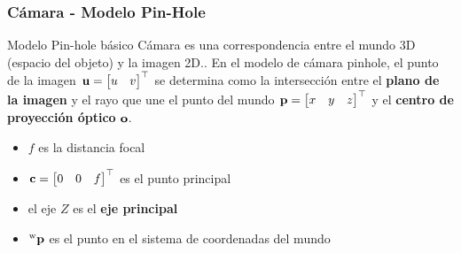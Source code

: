 \begin{frame}
    \frametitle{Cámara - Modelo Pin-Hole}
    
    
    \footnotesize
    \begin{figure}[!h]
        \centering
    \end{figure}
    
    \begin{block}{Modelo Pin-hole básico}
        Cámara es una correspondencia entre el mundo 3D (espacio del objeto) y la imagen 2D.. En el modelo de cámara pinhole, el punto de la imagen $\boldsymbol{\mathbf{u}}=\begin{bmatrix}u & v\end{bmatrix}^{\top}$ se determina como la intersección entre el {\bf plano de la imagen} y el rayo que une el punto del mundo $\boldsymbol{\mathbf{p}} =\begin{bmatrix}x & y & z\end{bmatrix}^{\top}$ y el {\bf centro de proyección óptico} $\boldsymbol{\mathbf{o}}$. 
    \end{block}
    
    \begin{itemize}
        \item $f$ es la distancia focal
        \item $\boldsymbol{\mathbf{c}} = \begin{bmatrix}0 & 0 & f\end{bmatrix}^{\top}$ es el punto principal
        \item el eje $Z$ es el {\bf eje principal}
        \item $\prescript{\mathrm{\mathrm{w}}}{}{\boldsymbol{\mathbf{p}}}$ es el punto en el sistema de coordenadas del mundo
    \end{itemize}
\end{frame}

